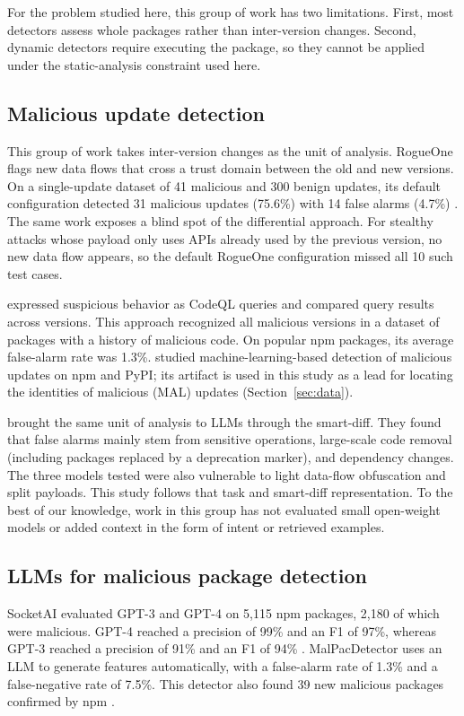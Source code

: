 \documentclass[a4paper,fleqn]{cas-dc}
\begin{document}
For the problem studied here, this group of work has two limitations. First,
most detectors assess whole packages rather than inter-version changes. Second,
dynamic detectors require executing the package, so they cannot be applied under
the static-analysis constraint used here.

\subsection{Malicious update detection}
This group of work takes inter-version changes as the unit of analysis.
RogueOne flags new data flows that cross a trust domain between the old
and new versions. On a single-update dataset of 41 malicious and 300 benign
updates, its default configuration detected 31 malicious updates (75.6\%) with
14 false alarms (4.7\%) \citep{sofaer2024rogueone}. The same work exposes a blind
spot of the differential approach. For stealthy attacks whose payload only uses
APIs already used by the previous version, no new data flow appears, so the
default RogueOne configuration missed all 10 such test cases.

\citet{froh2023differential} expressed suspicious behavior as CodeQL queries and
compared query results across versions. This approach recognized all malicious
versions in a dataset of packages with a history of malicious code. On popular
npm packages, its average false-alarm rate was 1.3\%. \citet{draz2026version}
studied machine-learning-based detection of malicious updates on npm and PyPI;
its artifact is used in this study as a lead for locating the identities of
malicious (MAL) updates (Section~\ref{sec:data}).

\citet{wyss2025evaluating} brought the same unit of analysis to LLMs through the
smart-diff. They found that false alarms mainly stem from sensitive
operations, large-scale code removal (including packages replaced by a
deprecation marker), and dependency changes. The three models tested were
also vulnerable to light data-flow obfuscation and split payloads. This study
follows that task and smart-diff representation. To the best of our knowledge,
work in this group has not evaluated small open-weight models or added
context in the form of intent or retrieved examples.

\subsection{LLMs for malicious package detection}
SocketAI evaluated GPT-3 and GPT-4 on 5,115 npm packages, 2,180 of which were
malicious. GPT-4 reached a precision of 99\% and an F1 of 97\%, whereas GPT-3
reached a precision of 91\% and an F1 of 94\% \citep{zahan2025leveraging}.
MalPacDetector uses an LLM to generate features automatically, with a
false-alarm rate of 1.3\% and a false-negative rate of 7.5\%. This detector also
found 39 new malicious packages confirmed by npm \citep{wang2025malpacdetector}.
\end{document}
